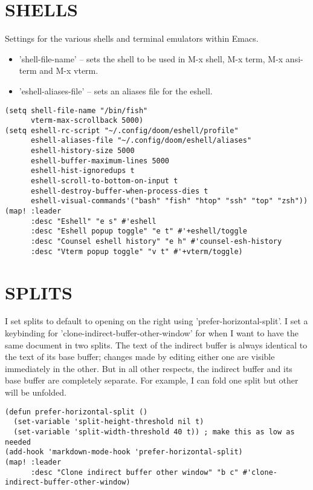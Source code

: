 \documentclass[11pt]{article}
\begin{document}
\section{SHELLS}
\label{sec:orgb74df21}
Settings for the various shells and terminal emulators within Emacs.
\begin{itemize}
\item 'shell-file-name' -- sets the shell to be used in M-x shell, M-x term, M-x ansi-term and M-x vterm.
\item 'eshell-aliases-file' -- sets an aliases file for the eshell.
\end{itemize}

\begin{verbatim}
(setq shell-file-name "/bin/fish"
      vterm-max-scrollback 5000)
(setq eshell-rc-script "~/.config/doom/eshell/profile"
      eshell-aliases-file "~/.config/doom/eshell/aliases"
      eshell-history-size 5000
      eshell-buffer-maximum-lines 5000
      eshell-hist-ignoredups t
      eshell-scroll-to-bottom-on-input t
      eshell-destroy-buffer-when-process-dies t
      eshell-visual-commands'("bash" "fish" "htop" "ssh" "top" "zsh"))
(map! :leader
      :desc "Eshell" "e s" #'eshell
      :desc "Eshell popup toggle" "e t" #'+eshell/toggle
      :desc "Counsel eshell history" "e h" #'counsel-esh-history
      :desc "Vterm popup toggle" "v t" #'+vterm/toggle)
\end{verbatim}

\section{SPLITS}
\label{sec:org1a923ab}
I set splits to default to opening on the right using 'prefer-horizontal-split'.  I set a keybinding for 'clone-indirect-buffer-other-window' for when I want to have the same document in two splits.  The text of the indirect buffer is always identical to the text of its base buffer; changes made by editing either one are visible immediately in the other.  But in all other respects, the indirect buffer and its base buffer are completely separate.  For example, I can fold one split but other will be unfolded.

\begin{verbatim}
(defun prefer-horizontal-split ()
  (set-variable 'split-height-threshold nil t)
  (set-variable 'split-width-threshold 40 t)) ; make this as low as needed
(add-hook 'markdown-mode-hook 'prefer-horizontal-split)
(map! :leader
      :desc "Clone indirect buffer other window" "b c" #'clone-indirect-buffer-other-window)
\end{verbatim}
\end{document}
